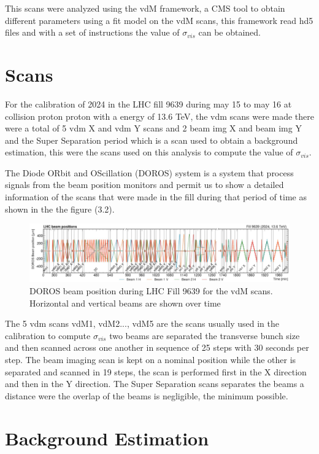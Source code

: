 This scans were analyzed using the vdM framework, a CMS tool to obtain different parameters using a fit model on the vdM scans, this framework read hd5 files and with a set of instructions the value of $\sigma_{vis}$ can be obtained. 
 
\section{Scans}

For the calibration of 2024 in the LHC fill 9639 during may 15 to may 16 at collision proton proton with a energy of 13.6 TeV, the vdm scans were made there were a total of 5 vdm X and vdm Y scans and 2 beam img X and beam img Y and the Super Separation period which is a scan used to obtain a background estimation, this were the scans used on this analysis to compute the value of $\sigma_{vis}$.  

The Diode ORbit and OScillation (DOROS) system is a system that process signals from the beam position monitors\cite{DOROS} and permit us to show a detailed information of the scans that were made in the fill during that period of time as shown in the the figure (3.2).

\begin{figure}[h]
    \centering
    \includegraphics[width=1\textwidth]{scans.png}
    \caption[Doros for fill 9639]{DOROS beam position during LHC Fill 9639 for the vdM scans. Horizontal and vertical beams are shown over time}
    \label{fig:scans}
\end{figure}

The 5 vdm scans vdM1, vdM2..., vdM5 are the scans usually used in the calibration to compute $\sigma_{vis}$ two beams are separated the transverse bunch size and then scanned across one another in sequence of 25 steps with 30 seconds per step. The beam imaging scan is kept on a nominal position while the other is separated and scanned in 19 steps, the scan is performed first in the X direction and then in the Y direction. The Super Separation scans separates the beams a distance were the overlap of the beams is negligible, the minimum possible.

\section{Background Estimation}

